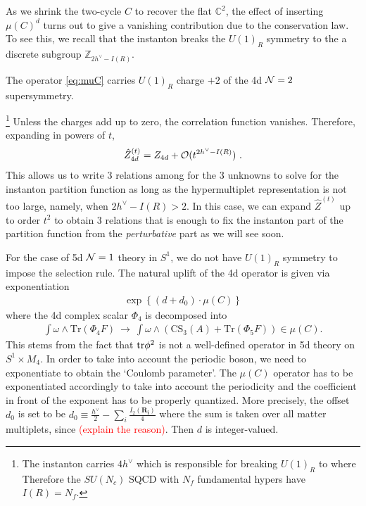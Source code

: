 \documentclass[letterpaper, 11pt]{article}
\def\IC{\mathbb{C}}
\def\IZ{\mathbb{Z}}
\def\CN{{\cal N}}
\def\CO{{\cal O}}
\def\tr{{\rm tr}}
\begin{document}
As we shrink the two-cycle $C$ to recover the flat $\IC^2$, the effect of  inserting $\mu(C)^d$ turns out to give a vanishing contribution due to the conservation law. To see this, we recall that the instanton breaks the $U(1)_R$ symmetry to the a discrete subgroup $\IZ_{2h^\vee - I(R)}$.

The operator \eqref{eq:muC} carries $U(1)_R$ charge $+2$ of the 4d $\CN=2$ supersymmetry.


\footnote{


 The instanton carries $4h^\vee$ which is responsible for breaking $U(1)_R$ to where Therefore the $SU(N_c)$ SQCD with $N_f$ fundamental hypers have $I(R) = N_f$.} Unless the charges add up to zero, the correlation function vanishes. Therefore, expanding in powers of $t$, 
\begin{align}
\hat{Z}_{4d}^{(t)} = Z_{4d} + \CO(t^{2h^\vee - I(R)})  \ . 
\end{align}
This allows us to write 3 relations among for the 3 unknowns to solve for the instanton partition function as long as the hypermultiplet representation is not too large, namely, when $2h^\vee - I(R) > 2$. In this case, we can expand $\hat{Z}^{(t)}$ up to order $t^2$ to obtain 3 relations that is enough to fix the instanton part of the partition function from the \emph{perturbative} part as we will see soon. 

For the case of 5d $\CN=1$ theory in $S^1$, we do not have $U(1)_R$ symmetry to impose the selection rule. The natural uplift of the 4d operator 
is given via exponentiation  \cite{Baulieu:1997nj}
\begin{align}
  \exp{ \left\{(d+d_0)\cdot  \mu (C)\right\} }
\end{align}
where the 4d complex scalar $\Phi_4$ is decomposed into
\begin{align}
  \int\omega \wedge \text{Tr}(\Phi_4 F) \ \longrightarrow \
  \int\omega \wedge \left(\text{CS}_3(A) + \text{Tr}(\Phi_5 F) \right) \in \mu(C).
\end{align}
This stems from the fact that $\tr \phi^2$ is not a well-defined operator in 5d theory on $S^1 \times M_4$. In order to take into account the periodic boson, we need to exponentiate to obtain the `Coulomb parameter'. The $\mu(C)$ operator has to be exponentiated accordingly to take into account the periodicity and the coefficient in front of the exponent has to be properly quantized. More precisely, the offset $d_0$ is set to be $d_0 \equiv \frac{h^\vee}{2} - \sum_{i} \frac{I_2(\mathbf{R_i})}{4}$ where the sum is taken over all matter multiplets, since \textcolor{red}{(explain the reason)}. Then $d$ is integer-valued.  
\end{document}
